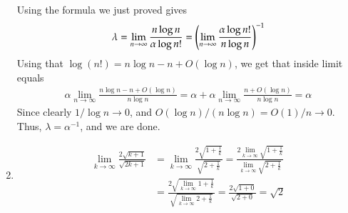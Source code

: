 \documentclass[12pt]{article}
\theoremstyle{definition}
\theoremstyle{remark}
\begin{document}
\begin{enumerate}[leftmargin=\labelsep]
\begin{align*}
 	\end{align*}
	Using the formula we just proved gives
	\begin{align*}
		\lambda = \lim_{n \to \infty} \frac{n\log n}{\alpha \log n!} = \qty(\lim_{n \to \infty} \frac{\alpha \log n!}{n \log n})^{-1}
	\end{align*}
	Using that $\log(n!) = n\log n - n + O(\log n)$, we get that inside limit equals
	\begin{align*}
		\alpha \lim_{n \to \infty} \frac{n \log n - n + O(\log n)}{n \log n} = \alpha + \alpha \lim_{n \to \infty} \frac{n + O(\log n)}{n \log n} = \alpha
	\end{align*}
	Since clearly $1/\log n \to 0$, and $O(\log n) / (n \log n) = O(1) / n \to 0$. Thus, $\lambda = \alpha^{-1}$, and we are done.
	
	\item \begin{align*}
		\lim_{k \to \infty} \frac{2\sqrt{k+1}}{\sqrt{2k+1}} &= \lim_{k \to \infty} \frac{2\sqrt{1+\frac1k}}{\sqrt{2 + \frac 1k}} = \frac{2\lim_{k \to \infty} \sqrt{1+\frac 1k}}{\lim_{k \to \infty} \sqrt{2+\frac 1k}} \\
		&= \frac{2\sqrt{\lim_{k \to \infty} 1 + \frac1k}}{\sqrt{\lim_{k \to \infty} 2 + \frac1k}} = \frac{2\sqrt{1+0}}{\sqrt{2+0}} = \sqrt{2}
	\end{align*}
	\end{enumerate}
\end{document}
